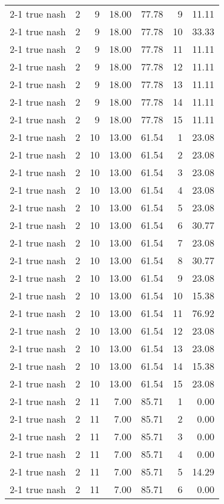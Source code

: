 \begin{tabular}{lrrrrrr}
2-1  true nash & 2 & 9 & 18.00 & 77.78 & 9 & 11.11 \\
2-1  true nash & 2 & 9 & 18.00 & 77.78 & 10 & 33.33 \\
2-1  true nash & 2 & 9 & 18.00 & 77.78 & 11 & 11.11 \\
2-1  true nash & 2 & 9 & 18.00 & 77.78 & 12 & 11.11 \\
2-1  true nash & 2 & 9 & 18.00 & 77.78 & 13 & 11.11 \\
2-1  true nash & 2 & 9 & 18.00 & 77.78 & 14 & 11.11 \\
2-1  true nash & 2 & 9 & 18.00 & 77.78 & 15 & 11.11 \\
2-1  true nash & 2 & 10 & 13.00 & 61.54 & 1 & 23.08 \\
2-1  true nash & 2 & 10 & 13.00 & 61.54 & 2 & 23.08 \\
2-1  true nash & 2 & 10 & 13.00 & 61.54 & 3 & 23.08 \\
2-1  true nash & 2 & 10 & 13.00 & 61.54 & 4 & 23.08 \\
2-1  true nash & 2 & 10 & 13.00 & 61.54 & 5 & 23.08 \\
2-1  true nash & 2 & 10 & 13.00 & 61.54 & 6 & 30.77 \\
2-1  true nash & 2 & 10 & 13.00 & 61.54 & 7 & 23.08 \\
2-1  true nash & 2 & 10 & 13.00 & 61.54 & 8 & 30.77 \\
2-1  true nash & 2 & 10 & 13.00 & 61.54 & 9 & 23.08 \\
2-1  true nash & 2 & 10 & 13.00 & 61.54 & 10 & 15.38 \\
2-1  true nash & 2 & 10 & 13.00 & 61.54 & 11 & 76.92 \\
2-1  true nash & 2 & 10 & 13.00 & 61.54 & 12 & 23.08 \\
2-1  true nash & 2 & 10 & 13.00 & 61.54 & 13 & 23.08 \\
2-1  true nash & 2 & 10 & 13.00 & 61.54 & 14 & 15.38 \\
2-1  true nash & 2 & 10 & 13.00 & 61.54 & 15 & 23.08 \\
2-1  true nash & 2 & 11 & 7.00 & 85.71 & 1 & 0.00 \\
2-1  true nash & 2 & 11 & 7.00 & 85.71 & 2 & 0.00 \\
2-1  true nash & 2 & 11 & 7.00 & 85.71 & 3 & 0.00 \\
2-1  true nash & 2 & 11 & 7.00 & 85.71 & 4 & 0.00 \\
2-1  true nash & 2 & 11 & 7.00 & 85.71 & 5 & 14.29 \\
2-1  true nash & 2 & 11 & 7.00 & 85.71 & 6 & 0.00 \\

\end{tabular}
